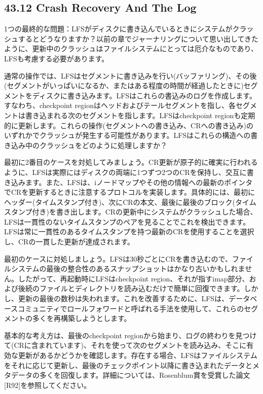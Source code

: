 \hypertarget{crash-recovery-and-the-log}{%
\subsection*{43.12 Crash Recovery And The
Log}\label{crash-recovery-and-the-log}}

1つの最終的な問題：LFSがディスクに書き込んでいるときにシステムがクラッシュするとどうなりますか？以前の章でジャーナリングについて思い出してきたように、更新中のクラッシュはファイルシステムにとっては厄介なものであり、LFSも考慮する必要があります。

通常の操作では、LFSはセグメントに書き込みを行い(バッファリング)、その後(セグメントがいっぱいになるか、またはある程度の時間が経過したときに)セグメントをディスクに書き込みます。LFSはこれらの書込みのログを作成します。すなわち、checkpoint
regionはヘッドおよびテールセグメントを指し、各セグメントは書き込まれる次のセグメントを指します。LFSはcheckpoint
regionも定期的に更新します。これらの操作(セグメントへの書き込み、CRへの書き込み)のいずれかでクラッシュが発生する可能性があります。LFSはこれらの構造への書き込み中のクラッシュをどのように処理しますか？

最初に2番目のケースを対処してみましょう。CR更新が原子的に確実に行われるように、LFSは実際にはディスクの両端に1つずつ2つのCRを保持し、交互に書き込みます。また、LFSは、iノードマップやその他の情報への最新のポインタでCRを更新するときに注意するプロトコルを実装します。具体的には、最初にヘッダー(タイムスタンプ付き)、次にCRの本文、最後に最後のブロック(タイムスタンプ付き)を書き出します。CRの更新中にシステムがクラッシュした場合、LFSは一貫性のないタイムスタンプのペアを見ることでこれを検出できます。LFSは常に一貫性のあるタイムスタンプを持つ最新のCRを使用することを選択し、CRの一貫した更新が達成されます。

最初のケースに対処しましょう。LFSは30秒ごとにCRを書き込むので、ファイルシステムの最後の整合性のあるスナップショットはかなり古いかもしれません。したがって、再起動時にLFSはcheckpoint
region、それが指すimap部分、および後続のファイルとディレクトリを読み込むだけで簡単に回復できます。しかし、更新の最後の数秒は失われます。これを改善するために、LFSは、データベースコミュニティでロールフォワードと呼ばれる手法を使用して、これらのセグメントの多くを再構築しようとします。

基本的な考え方は、最後のcheckpoint
regionから始まり、ログの終わりを見つけて(CRに含まれています)、それを使って次のセグメントを読み込み、そこに有効な更新があるかどうかを確認します。存在する場合、LFSはファイルシステムをそれに応じて更新し、最後のチェックポイント以降に書き込まれたデータとメタデータの多くを回復します。詳細については、Rosenblum賞を受賞した論文{[}R92{]}を参照してください。


